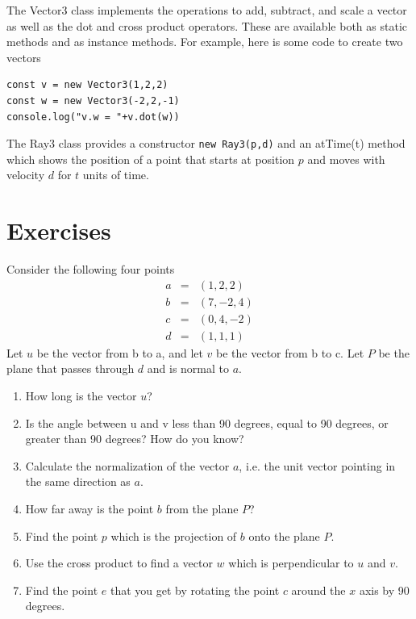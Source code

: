 \documentclass{book}
\begin{document}
The Vector3 class implements the operations to add, subtract, and scale a vector as well as the dot and cross product operators. These are available both as static methods and as instance methods. For example, here is some code to create two vectors
\begin{verbatim}
const v = new Vector3(1,2,2)
const w = new Vector3(-2,2,-1)
console.log("v.w = "+v.dot(w))
\end{verbatim}
The Ray3 class provides a constructor {\tt new Ray3(p,d)} and an atTime(t) method which shows the position of a point that starts at position $p$ and moves with velocity $d$ for $t$ units of time.


\section{Exercises  \label{ex:vectors}}
Consider the following four points
\begin{eqnarray*}
a &=& (1, 2, 2) \\
b &=& (7, -2, 4) \\
c &=& (0, 4, -2) \\
d &=& (1, 1, 1)
\end{eqnarray*}
Let $u$ be the vector from b to a, and let $v$ be the vector from b to c.
Let $P$ be the plane that passes through $d$ and is normal to $a$.
\begin{enumerate}
\item How long is the vector $u$?
\item Is the angle between u and v less than 90 degrees, equal to 90 degrees, or greater than 90 degrees? How do you know?
\item Calculate the normalization of the vector $a$, i.e. the unit vector pointing in the same direction as $a$.
\item How far away is the point $b$ from the plane $P$?
\item Find the point $p$ which is the projection of $b$ onto the plane $P$.
\item Use the cross product to find a vector $w$ which is perpendicular to $u$ and $v$.
\item Find the point $e$ that you get by rotating the point $c$ around the $x$ axis by 90 degrees.
\end{enumerate}
\end{document}
